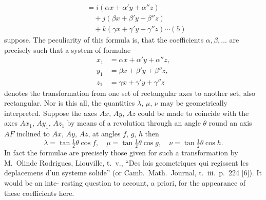 \documentclass[11pt,a4paper]{book}
\begin{document}
\begin{equation}
\begin{aligned}
&= i(\alpha x + \alpha' y + \alpha'' z) \\
&\quad + j(\beta x + \beta' y + \beta'' z) \\
&\quad + k(\gamma x + \gamma' y + \gamma'' z) \cdots (5)
\end{aligned}
\end{equation}
suppose. The peculiarity of this formula is, that the coefficients $\alpha, \beta, \ldots$ are precisely
such that a system of formulae
\begin{align*}
x_1 &= \alpha x + \alpha' y + \alpha'' z,\\
y_1 &= \beta x + \beta' y + \beta'' z,\\
z_1 &= \gamma x + \gamma' y + \gamma'' z
\end{align*}
denotes the transformation from one set of rectangular axes to another set, also
rectangular. Nor is this all, the quantities $\lambda$, $\mu$, $\nu$ may be geometrically interpreted.
Suppose the axes $Ax$, $Ay$, $Az$ could be made to coincide with the axes $Ax_1$, $Ay_1$, $Az_1$
by means of a revolution through an angle $\theta$ round an axis $AF$ inclined to $Ax$, $Ay$, $Az$,
at angles $f$, $g$, $h$ then
\[
\lambda = \tan\tfrac{1}{2}\theta \cos f,\quad \mu = \tan\tfrac{1}{2}\theta \cos g,\quad \nu = \tan\tfrac{1}{2}\theta \cos h.
\]
In fact the formulae are precisely those given for such a transformation by M.~Olinde
Rodrigues, Liouville, t.~v., ``Des lois geometriques qui regissent les deplacemens d'un
systeme solide'' (or Camb.\ Math.\ Journal, t.~iii.\ p.~224 [6]). It would be an inte-
resting question to account, a priori, for the appearance of these coefficients here.
\end{document}
